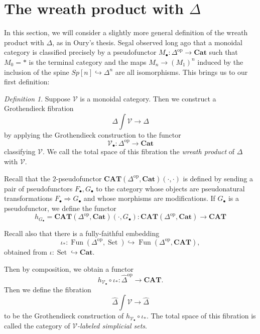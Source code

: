 \documentclass{amsart}
\numberwithin{equation}{section}
\theoremstyle{plain}   %
\theoremstyle{remark}
\newtheorem{defn}[subsection]{Definition}
\theoremstyle{plain}
\newcommand{\op}{\ensuremath{\mathrm{op}}}
\newcommand{\Cat}{\ensuremath{\mathbf{Cat}}}
\newcommand{\psh}[1]{\ensuremath{\widehat{#1}}}
\begin{document}
\section{The wreath product with \(\Delta\)}
In this section, we will consider a slightly more general definition of the wreath product with \(\Delta\), as in Oury's thesis. Segal observed long ago that a monoidal category is classified precisely by a pseudofunctor \(M_\bullet:\Delta^\op\to \Cat\) such that \(M_0=\ast\) is the terminal category and the maps \(M_n \to {(M_1)}^n\) induced by the inclusion of the spine \(Sp[n]\hookrightarrow \Delta^n\) are all isomorphisms.  This brings us to our first definition:

\begin{defn}
	Suppose \(\mathcal{V}\) is a monoidal category.  Then we construct a Grothendieck fibration \[\Delta\int\mathcal{V}\to \Delta\] by applying the Grothendieck construction to the functor \[\mathcal{V}_\bullet:\Delta^\op\to \Cat\] classifying \(\mathcal{V}\). We call the total space of this fibration the \emph{wreath product} of \(\Delta\) with \(\mathcal{V}\).

	Recall that the \(2\)-pseudofunctor \(\mathbf{CAT}(\Delta^\op, \Cat)(\cdot,\cdot)\) is defined by sending a pair of pseudofunctors \(F_\bullet,G_\bullet\) to the category whose objects are pseudonatural transformations \(F_\bullet\Rightarrow G_\bullet\) and whose morphisms are modifications. If \(G_\bullet\) is a pseudofunctor, we define the functor \[h_{G_\bullet}=\mathbf{CAT}(\Delta^\op, \Cat)(\cdot,G_\bullet):\mathbf{CAT}(\Delta^\op, \Cat)\to \mathbf{CAT}\]

	Recall also that there is a fully-faithful embedding \[\iota_*:\operatorname{Fun}(\Delta^\op,\operatorname{Set}) \hookrightarrow \operatorname{Fun}(\Delta^\op,\mathbf{CAT}),\] obtained from \(\iota:\operatorname{Set} \hookrightarrow \Cat\).

	Then by composition, we obtain a functor \[h_{\mathcal{V}_\bullet}\circ \iota_*: \psh{\Delta}^\op \to \mathbf{CAT}.\] Then we define the fibration \[\psh{\Delta}\int \mathcal{V} \to \psh{\Delta}\] to be the Grothendieck construction of \(h_{\mathcal{V}_\bullet}\circ\iota_*\). The total space of this fibration is called the category of \emph{\(\mathcal{V}\)-labeled simplicial sets}.
\end{defn}
\end{document}
